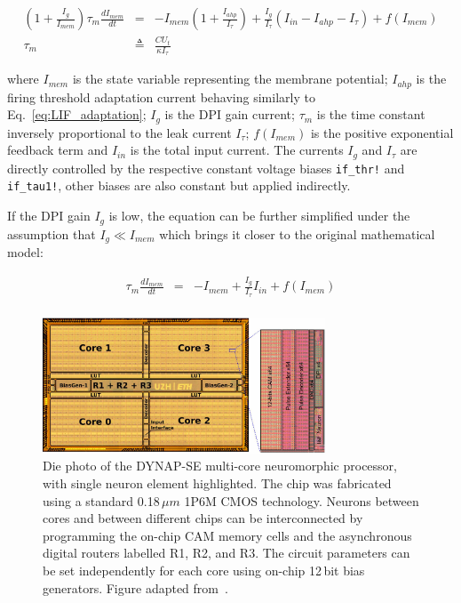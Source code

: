 \begin{eqnarray}
    \left(1+\frac{I_g}{I_{mem}}\right)\tau_m\frac{dI_{mem}}{dt}&=&-I_{mem} \left( 1+\frac{I_{ahp}}{I_\tau} \right) + \frac{I_g}{I_{\tau}}(I_{in} - I_{ahp} - I_{\tau}) + f(I_{mem})
    \label{eq:dynapse_LIF}\\
    \tau_m & \triangleq & \frac{CU_t}{\kappa I_{\tau}}
    \label{eq:dynapse_LIF_TC}
\end{eqnarray}

where $I_{mem}$ is the state variable representing the membrane potential; $I_{ahp}$ is the firing threshold adaptation current behaving similarly to Eq.~\ref{eq:LIF_adaptation}; $I_{g}$ is the DPI gain current; $\tau_{m}$ is the time constant inversely proportional to the leak current $I_{\tau}$; $f(I_{mem})$ is the positive exponential feedback term and $I_{in}$ is the total input current. The currents $I_{g}$ and $I_{\tau}$ are directly controlled by the respective constant voltage biases \verb|if_thr!| and \verb|if_tau1!|, other biases are also constant but applied indirectly.

If the DPI gain $I_{g}$ is low, the equation can be further simplified under the assumption that $I_{g} \ll I_{mem}$ which brings it closer to the original mathematical model:

\begin{eqnarray}
    \tau_m\frac{dI_{mem}}{dt}&=&-I_{mem} + \frac{I_g}{I_{\tau}}I_{in} + f(I_{mem})\\
    \label{eq:dynapse_LIF}
\end{eqnarray}

\begin{figure}[h]
  \centering
  \includegraphics[width=0.75\textwidth]{img/chapter4/chip-dynap-se-pixel.pdf}
  \caption[Die photo of the DYNAP-SE multi-core neuromorphic processor]{Die photo of the DYNAP-SE multi-core neuromorphic processor, with single neuron element highlighted.
The chip was fabricated using a standard 0.18\,$\mu m$ 1P6M \ac{CMOS} technology.
Neurons between cores and between different chips can be interconnected by programming the on-chip CAM memory cells and the asynchronous digital routers labelled R1, R2, and R3.
The circuit parameters can be set independently for each core using on-chip 12\,bit bias generators. Figure adapted from~\cite{Moradi_etal18}.}
  \label{fig:dynapse}
\end{figure}


